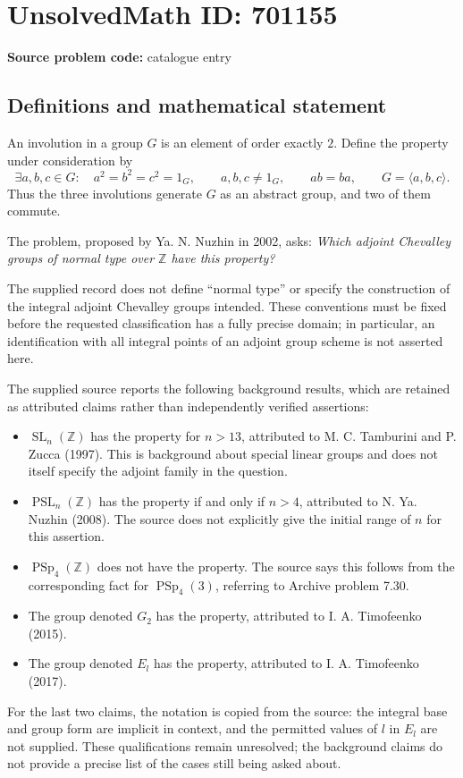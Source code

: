 \documentclass[11pt]{article}
\newcommand{\Z}{\mathbb{Z}}
\begin{document}
\section*{UnsolvedMath ID: 701155}
\textbf{Source problem code:} catalogue entry
\subsection{Definitions and mathematical statement}
An involution in a group \(G\) is an element of order exactly \(2\). Define the property under consideration by
\[
\exists a,b,c\in G:\quad a^2=b^2=c^2=1_G,\qquad a,b,c\ne 1_G,\qquad ab=ba,\qquad G=\langle a,b,c\rangle.
\]
Thus the three involutions generate \(G\) as an abstract group, and two of them commute.

The problem, proposed by Ya. N. Nuzhin in 2002, asks: \emph{Which adjoint Chevalley groups of normal type over \(\Z\) have this property?}

The supplied record does not define ``normal type'' or specify the construction of the integral adjoint Chevalley groups intended. These conventions must be fixed before the requested classification has a fully precise domain; in particular, an identification with all integral points of an adjoint group scheme is not asserted here.

The supplied source reports the following background results, which are retained as attributed claims rather than independently verified assertions:
\begin{itemize}
\item \(\operatorname{SL}_n(\Z)\) has the property for \(n>13\), attributed to M. C. Tamburini and P. Zucca (1997). This is background about special linear groups and does not itself specify the adjoint family in the question.
\item \(\operatorname{PSL}_n(\Z)\) has the property if and only if \(n>4\), attributed to N. Ya. Nuzhin (2008). The source does not explicitly give the initial range of \(n\) for this assertion.
\item \(\operatorname{PSp}_4(\Z)\) does not have the property. The source says this follows from the corresponding fact for \(\operatorname{PSp}_4(3)\), referring to Archive problem 7.30.
\item The group denoted \(G_2\) has the property, attributed to I. A. Timofeenko (2015).
\item The group denoted \(E_l\) has the property, attributed to I. A. Timofeenko (2017).
\end{itemize}
For the last two claims, the notation is copied from the source: the integral base and group form are implicit in context, and the permitted values of \(l\) in \(E_l\) are not supplied. These qualifications remain unresolved; the background claims do not provide a precise list of the cases still being asked about.
\end{document}
